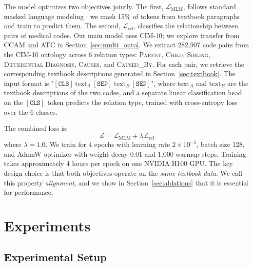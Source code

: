 The model optimizes two objectives jointly. The first, $\mathcal{L}_{\text{MLM}}$, follows standard masked language modeling \citep{devlin_bert_2019}: we mask 15\% of tokens from textbook paragraphs and train to predict them. The second, $\mathcal{L}_{\text{rel}}$, classifies the relationship between pairs of medical codes. Our main model uses CIM-10; we explore transfer from CCAM and ATC in Section~\ref{sec:multi_onto}. We extract 282,907 code pairs from the CIM-10 ontology across 6 relation types: \textsc{Parent}, \textsc{Child}, \textsc{Sibling}, \textsc{Differential Diagnosis}, \textsc{Causes}, and \textsc{Caused\_By}. For each pair, we retrieve the corresponding textbook descriptions generated in Section~\ref{sec:textbook}. The input format is "$[\texttt{CLS}]~\text{text}_A~[\texttt{SEP}]~\text{text}_B~[\texttt{SEP}]$", where $\text{text}_A$ and $\text{text}_B$ are the textbook descriptions of the two codes, and a separate linear classification head on the $[\texttt{CLS}]$ token predicts the relation type, trained with cross-entropy loss over the 6 classes.

The combined loss is:
\begin{equation}
\mathcal{L} = \mathcal{L}_{\text{MLM}} + \lambda \mathcal{L}_{\text{rel}}
\end{equation}
where $\lambda = 1.0$. We train for 4 epochs with learning rate $2 \times 10^{-5}$, batch size 128, and AdamW optimizer with weight decay 0.01 and 1,000 warmup steps. Training takes approximately 4 hours per epoch on one NVIDIA H100 GPU. The key design choice is that both objectives operate on the \emph{same textbook data}. We call this property \emph{alignment}, and we show in Section~\ref{sec:ablations} that it is essential for performance.
\section{Experiments}
\label{sec:experiments}

\subsection{Experimental Setup}
\label{sec:setup}

